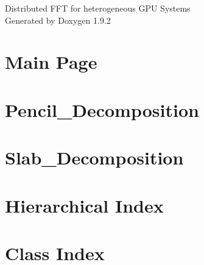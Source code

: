 \documentclass[twoside]{book}
\newcommand{\+}{\discretionary{\mbox{\scriptsize$\hookleftarrow$}}{}{}}
\newcommand{\clearemptydoublepage}{%
    \newpage{\pagestyle{empty}\cleardoublepage}%
  }
\begin{document}
  \raggedbottom
    \hypersetup{pageanchor=false,
                bookmarksnumbered=true,
                pdfencoding=unicode
               }
  \begin{titlepage}
  \vspace*{7cm}
  \begin{center}%
  {\Large Distributed FFT for heterogeneous GPU Systems}\\
  \vspace*{1cm}
  {\large Generated by Doxygen 1.9.2}\\
  \end{center}
  \end{titlepage}
  \clearemptydoublepage
  \tableofcontents
  \clearemptydoublepage
  \hypersetup{pageanchor=true}
\chapter{Main Page}
\label{index}\hypertarget{index}{}
\chapter{Pencil\+\_\+\+Decomposition}
\label{Pencil_Decomposition}

\chapter{Slab\+\_\+\+Decomposition}
\label{Slab_Decomposition}

\chapter{Hierarchical Index}

\chapter{Class Index}

\end{document}
